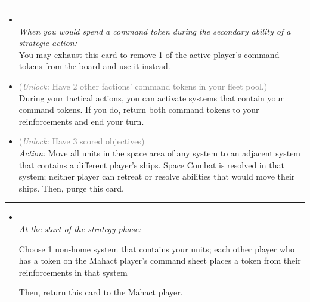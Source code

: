 \begin{multicols}{2}
\vspace{-10pt}\rule{\hsize}{0.4pt}\vspace{5pt}


\begin{itemize}
\item {}\\
\emph{When you would spend a command token during the secondary ability of a strategic action:}
\\
You may exhaust this card to remove 1 of the active player's command tokens from the board and use it instead.
\item {} \textcolor{gray}{(\emph{Unlock:} Have 2 other factions' command tokens in your fleet pool.)}\\
During your tactical actions, you can activate systems that contain your command tokens. If you do, return both command tokens to your reinforcements and end your turn. 
\item {} \textcolor{gray}{(\emph{Unlock:} Have 3 scored objectives)}\\
\emph{Action:} Move all units in the space area of any system to an adjacent system that contains a different player's ships. Space Combat is resolved in that system; neither player can retreat or resolve abilities that would move their ships. Then, purge this card.
\end{itemize}

\vspace{-10pt}\rule{\hsize}{0.4pt}\vspace{5pt}


\begin{itemize}
\item {}\\
\emph{At the start of the strategy phase: }

Choose 1 non-home system that contains your units; each other player who has a token on the Mahact player's command sheet places a token from their reinforcements in that system

Then, return this card to the Mahact player. 
\end{itemize}

\end{multicols}



